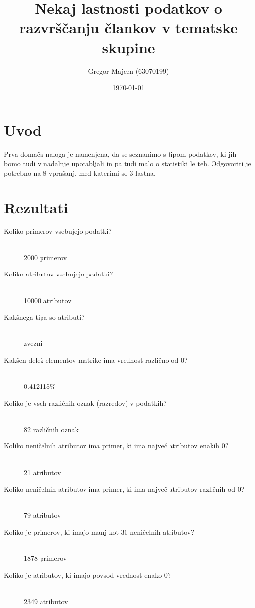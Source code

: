 \documentclass[a4paper,11pt]{article}
\title{Nekaj lastnosti podatkov o razvrščanju člankov v tematske skupine}
\author{Gregor Majcen (63070199)}
\date{\today}
\begin{document}
\maketitle

\section{Uvod}
Prva domača naloga je namenjena, da se seznanimo s tipom podatkov, ki jih bomo tudi v nadalnje uporabljali in pa tudi malo o statistiki le teh. Odgovoriti je potrebno na 8 vprašanj, med katerimi so 3 lastna.

\section{Rezultati}

\begin{description}
\item[Koliko primerov vsebujejo podatki?] \hfill \\ 2000 primerov 
\item[Koliko atributov vsebujejo podatki?] \hfill \\ 10000 atributov
\item[Kakšnega tipa so atributi?] \hfill \\ zvezni
\item[Kakšen delež elementov matrike ima vrednost različno od 0?] \hfill \\ 0.412115\%
\item[Koliko je vseh različnih oznak (razredov) v podatkih?] \hfill \\ 82 različnih oznak
\item[Koliko neničelnih atributov ima primer, ki ima največ atributov enakih 0?] \hfill \\ 21 atributov  
\item[Koliko neničelnih atributov ima primer, ki ima največ atributov različnih od 0?] \hfill \\ 79 atributov
\item[Koliko je primerov, ki imajo manj kot 30 neničelnih atributov?] \hfill \\ 1878 primerov
\item[Koliko je atributov, ki imajo povsod vrednost enako 0?] \hfill \\ 2349 atributov


\end{description}
\end{document}
